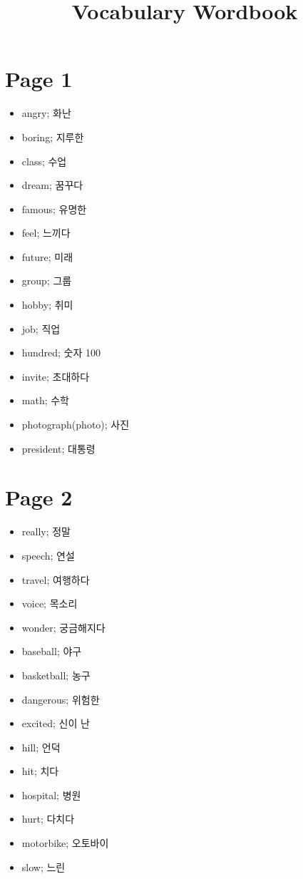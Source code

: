 \documentclass[12pt,a4paper]{article}
\begin{document}
\title{Vocabulary Wordbook}
\author{}
\date{}
\maketitle

\section*{Page 1}
\begin{itemize}
    \item angry; 화난
    \item boring; 지루한
    \item class; 수업
    \item dream; 꿈꾸다
    \item famous; 유명한
    \item feel; 느끼다
    \item future; 미래
    \item group; 그룹
    \item hobby; 취미
    \item job; 직업
    \item hundred; 숫자 100
    \item invite; 초대하다
    \item math; 수학
    \item photograph(photo); 사진
    \item president; 대통령
\end{itemize}
\newpage

\section*{Page 2}
\begin{itemize}
    \item really; 정말
    \item speech; 연설
    \item travel; 여행하다
    \item voice; 목소리
    \item wonder; 궁금해지다
    \item baseball; 야구
    \item basketball; 농구
    \item dangerous; 위험한
    \item excited; 신이 난
    \item hill; 언덕
    \item hit; 치다
    \item hospital; 병원
    \item hurt; 다치다
    \item motorbike; 오토바이
    \item slow; 느린
\end{itemize}
\newpage
\end{document}
